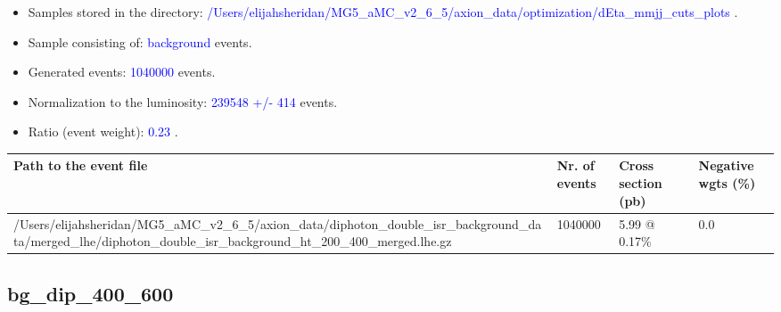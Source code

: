 \documentclass[a4paper, 10pt]{article}
\begin{document}
\begin{itemize}
  \item Samples stored in the directory: \textcolor{blue}{/\-Users/\-elijahsheridan/\-MG5\_aMC\_v2\_6\_5/\-axion\_data/\-optimization/\-dEta\_mmjj\_cuts\_plots} .
   \item Sample consisting of: \textcolor{blue}{background}  events.
   \item Generated events: \textcolor{blue}{1040000 }  events.
   \item Normalization to the luminosity: \textcolor{blue}{239548}\textcolor{blue}{ +/\-- }\textcolor{blue}{414 }  events.
   \item Ratio (event weight): \textcolor{blue}{0.23 } .  
 
\end{itemize}
\begin{table}[H]
  \begin{center}
    \begin{tabular}{|m{55.0mm}|m{25.0mm}|m{30.0mm}|m{30.0mm}|}
      \hline
      {\cellcolor{yellow}         Path to the event file}& {\cellcolor{yellow}         Nr. of events}& {\cellcolor{yellow}         Cross section (pb)}& {\cellcolor{yellow}         Negative wgts (\%)}\\
      \hline
      {\cellcolor{white}          /\-Users/\-elijahsheridan/\-MG5\_aMC\_v2\_6\_5/\-axion\_data/\-diphoton\_double\_isr\_background\_data/\-merged\_lhe/\-diphoton\_double\_isr\_background\_ht\_200\_400\_merged.lhe.gz}& {\cellcolor{white}          1040000}& {\cellcolor{white}          5.99 @ 0.17\%}& {\cellcolor{white}          0.0}\\
\hline
    \end{tabular}
  \end{center}
\end{table}

\subsection{ bg\_dip\_400\_600}
\end{document}
